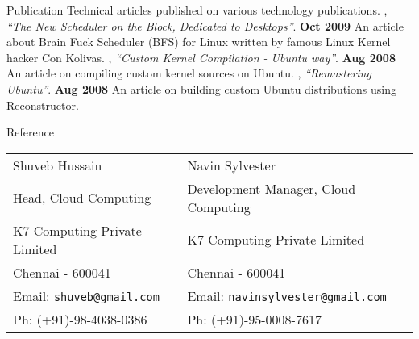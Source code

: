\documentclass{resume}
\begin{document}

\begin{category}{Publication}
  \citemnobullet Technical articles published on various technology publications.
  , {\em ``The New Scheduler on the Block, Dedicated to Desktops''}. \hfill \textbf{Oct 2009}
  \citemnobullet An article about Brain Fuck Scheduler (BFS) for Linux written by famous Linux Kernel hacker Con Kolivas.
  , {\em ``Custom Kernel Compilation - Ubuntu way''}. \hfill \textbf{Aug 2008}
  \citemnobullet An article on compiling custom kernel sources on Ubuntu.
  , {\em ``Remastering Ubuntu''}. \hfill \textbf{Aug 2008}
  \citemnobullet An article on building custom Ubuntu distributions using Reconstructor.
\end{category}


\begin{category}{Reference}
  \citemnobullet \\
  \begin{tabular}{ll}Shuveb Hussain&Navin Sylvester\\
    Head, Cloud Computing&Development Manager, Cloud Computing\\
    K7 Computing Private Limited&K7 Computing Private Limited\\
    Chennai - 600041&Chennai - 600041\\
    Email: \mbox{\small\tt shuveb@gmail.com}&Email: \mbox{\small\tt navinsylvester@gmail.com}\\
    Ph: (+91)-98-4038-0386&Ph: (+91)-95-0008-7617
  \end{tabular}
\end{category}
\end{document}
